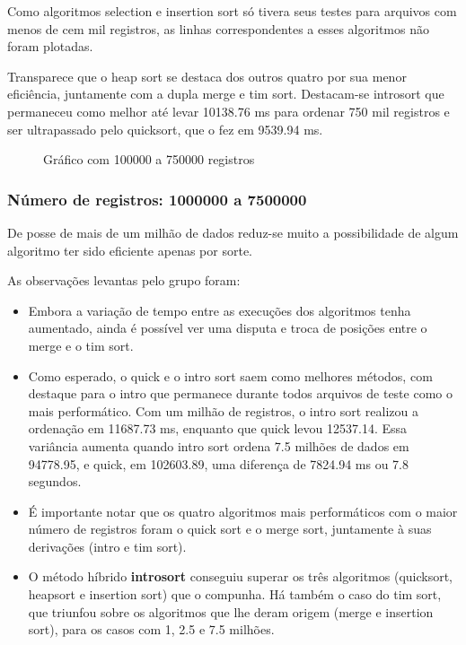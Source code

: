 \documentclass[a4paper,12pt]{scrartcl}
\begin{document}
Como algoritmos selection e insertion sort só tivera seus testes para arquivos com menos de cem mil registros, as linhas correspondentes a esses algoritmos não foram plotadas.

Transparece que o heap sort se destaca dos outros quatro por sua menor eficiência, juntamente com a dupla merge e tim sort. Destacam-se introsort que permaneceu como melhor até levar 10138.76 ms para ordenar 750 mil registros e ser ultrapassado pelo quicksort, que o fez em 9539.94 ms.

\begin{figure}[H]
    \centering
    
    \caption{Gráfico com 100000 a 750000 registros}
    \label{mapaSelect}
\end{figure}

\subsubsection{Número de registros: 1000000 a 7500000}

De posse de mais de um milhão de dados reduz-se muito a possibilidade de algum algoritmo ter sido eficiente apenas por sorte.

As observações levantas pelo grupo foram:
\begin{itemize}
    \item
    Embora a variação de tempo entre as execuções dos algoritmos tenha aumentado, ainda é possível ver uma disputa e troca de posições entre o merge e o tim sort.

    \item
    Como esperado, o quick e o intro sort saem como melhores métodos, com destaque para o intro que permanece durante todos arquivos de teste como o mais performático. Com um milhão de registros, o intro sort realizou a ordenação em 11687.73 ms, enquanto que quick levou 12537.14. Essa variância aumenta quando intro sort ordena 7.5 milhões de dados em 94778.95, e quick, em 102603.89, uma diferença de 7824.94 ms ou 7.8 segundos.
    
    \item É importante notar que os quatro algoritmos mais performáticos com o maior número de registros foram o quick sort e o merge sort, juntamente à suas derivações (intro e tim sort).
    
    \item
    O método híbrido \textbf{introsort} conseguiu superar os três algoritmos (quicksort, heapsort e insertion sort) que o compunha. Há também o caso do tim sort, que triunfou sobre os algoritmos que lhe deram origem (merge e insertion sort), para os casos com 1, 2.5 e 7.5 milhões.
    
\end{itemize}
\end{document}

